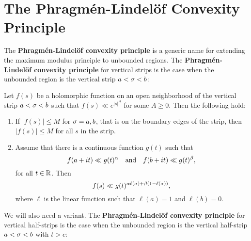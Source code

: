   \section{The Phragm\'en-Lindel\"of Convexity Principle}\label{append:The_Phragmen_Lindelof_Convexity_principle}
    The \textbf{Phragm\'en-Lindel\"of convexity principle} is a generic name for extending the maximum modulus principle to unbounded regions. The \textbf{Phragm\'en-Lindel\"of convexity principle} for vertical strips is the case when the unbounded region is the vertical strip $a < \sigma < b$:

    \begin{theorem}\label{thm:Phragmen-Lindelof_convexity_principle}
      Let $f(s)$ be a holomorphic function on an open neighborhood of the vertical strip $a < \sigma < b$ such that $f(s) \ll e^{|s|^{A}}$ for some $A \ge 0$. Then the following hold:
      \begin{enumerate}[label=(\roman*)]
        \item If $|f(s)| \le M$ for $\sigma = a,b$, that is on the boundary edges of the strip, then $|f(s)| \le M$ for all $s$ in the strip.
        \item Assume that there is a continuous function $g(t)$ such that
        \[
          f(a+it) \ll g(t)^{\alpha} \quad \text{and} \quad f(b+it) \ll g(t)^{\beta},
        \]
        for all $t \in \mathbb{R}$. Then
        \[
          f(s) \ll g(t)^{\alpha\ell(\sigma)+\beta(1-\ell(\sigma))},
        \]
        where $\ell$ is the linear function such that $\ell(a) = 1$ and $\ell(b) = 0$.
      \end{enumerate}
    \end{theorem}

    We will also need a variant. The \textbf{Phragm\'en-Lindel\"of convexity principle} for vertical half-strips is the case when the unbounded region is the vertical half-strip $a < \sigma < b$ with $t > c$:

